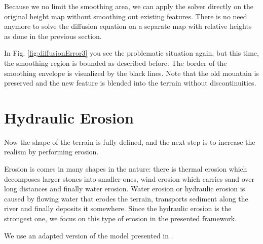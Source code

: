 \documentclass[journal, letterpaper]{IEEEtran}
\begin{document}
Because we no limit the smoothing area, we can apply the solver directly on the original height map without smoothing out existing features. There is no need anymore to solve the diffusion equation on a separate map with relative heights as done in the previous section.

In Fig. \ref{fig:diffusionError3} you see the problematic situation again, but this time, the smoothing region is bounded as described before. The border of the smoothing envelope is visualized by the black lines. Note that the old mountain is preserved and the new feature is blended into the terrain without discontinuities.

\section{Hydraulic Erosion}\label{HydraulicErosion}
Now the shape of the terrain is fully defined, and the next step is to increase the realism by performing erosion.

Erosion is comes in many shapes in the nature: there is thermal erosion which decomposes larger stones into smaller ones, wind erosion which carries sand over long distances and finally water erosion.
Water erosion or hydraulic erosion is caused by flowing water that erodes the terrain, transports sediment along the river and finally deposits it somewhere.
Since the hydraulic erosion is the strongest one, we focus on this type of erosion in the presented framework.

We use an adapted version of the model presented in \cite{Mei.}.
\end{document}
